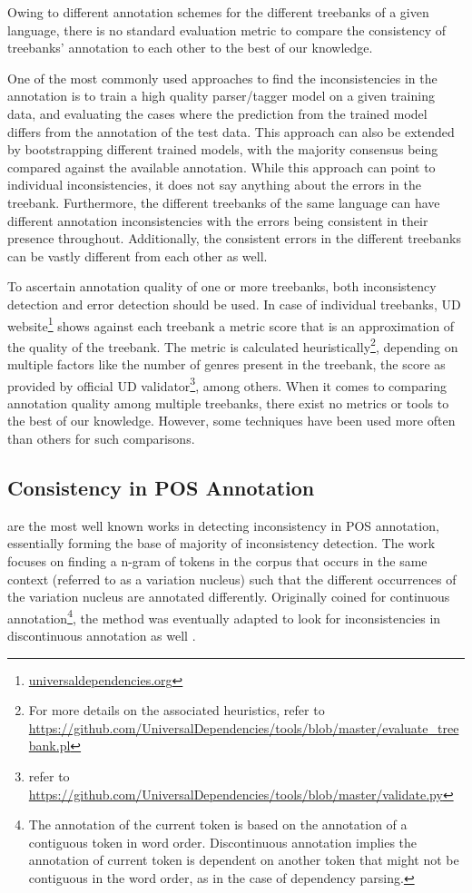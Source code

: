 Owing to different annotation schemes for the different treebanks of a given language, there is no standard evaluation metric to compare the consistency of treebanks' annotation to each other to the best of our knowledge. 

One of the most commonly used approaches to find the inconsistencies in the annotation is to train a high quality parser/tagger model on a given training data, and evaluating the cases where the prediction from the trained model differs from the annotation of the test data. This approach can also be extended by bootstrapping different trained models, with the majority consensus being compared against the available annotation. While this approach can point to individual inconsistencies, it does not say anything about the errors in the treebank. Furthermore, the different treebanks of the same language can have different annotation inconsistencies with the errors being consistent in their presence throughout. Additionally, the consistent errors in the different treebanks can be vastly different from each other as well.

To ascertain annotation quality of one or more treebanks, both inconsistency detection and error detection should be used. In case of individual treebanks, UD website\footnote{\url{universaldependencies.org}} shows against each treebank a metric score that is an approximation of the quality of the treebank. The metric is calculated heuristically\footnote{For more details on the associated heuristics, refer to \url{https://github.com/UniversalDependencies/tools/blob/master/evaluate_treebank.pl}}, depending on multiple factors like the number of genres present in the treebank, the score as provided by official UD validator\footnote{refer to \url{https://github.com/UniversalDependencies/tools/blob/master/validate.py}}, among others. When it comes to comparing annotation quality among multiple treebanks, there exist no metrics or tools to the best of our knowledge. However, some techniques have been used more often than others for such comparisons.

\subsection{Consistency in POS Annotation}
\label{ssec:inconsistency-detection-pos}

\cite{dickinson03a, dickinson03b} are the most well known works in detecting inconsistency in POS annotation, essentially forming the base of majority of inconsistency detection. The work focuses on finding a n-gram of tokens in the corpus that occurs in the same context (referred to as a variation nucleus) such that the different occurrences of the variation nucleus are annotated differently. Originally coined for continuous annotation\footnote{The annotation of the current token is based on the annotation of a contiguous token in word order. Discontinuous annotation implies the annotation of current token is dependent on another token that might not be contiguous in the word order, as in the case of dependency parsing.}, the method was eventually adapted to look for inconsistencies in discontinuous annotation as well \citep{dickinson05}.

